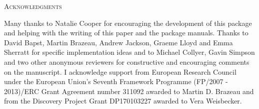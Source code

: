\documentclass[12pt,letterpaper]{article}
\renewcommand{\section}[1]{%
\bigskip
\begin{center}
\begin{Large}
\normalfont\scshape #1
\medskip
\end{Large}
\end{center}}
\begin{document}
\section{Acknowledgments}
Many thanks to Natalie Cooper for encouraging the development of this package and helping with the writing of this paper and the package manuals.
Thanks to David Bapst, Martin Brazeau, Andrew Jackson, Graeme Lloyd and Emma Sherratt for specific implementation ideas and to Michael Collyer, Gavin Simpson and two other anonymous reviewers for constructive and encouraging comments on the manuscript.
I acknowledge support from European Research Council under the European Union's Seventh Framework Programme (FP/2007 - 2013)/ERC Grant Agreement number 311092 awarded to Martin D. Brazeau and from the Discovery Project Grant DP170103227 awarded to Vera Weisbecker.



\end{document}
